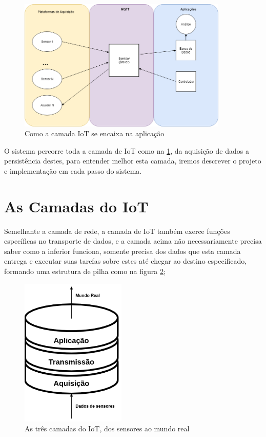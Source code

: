 \begin{figure}[h!]
\centering
\includegraphics[width=10cm]{./02_Capitulos/02_Cap1/figures/iot_app-layers}
\caption{Como a camada IoT se encaixa na aplicação}
\label{fig:1.1.0/iot_app-layers}
\end{figure}


O sistema percorre toda a camada de IoT como na \ref{fig:1.1.0/iot_app-layers}, da aquisição de dados a persistência destes, para entender melhor esta camada, iremos descrever o projeto e implementação em cada passo do sistema.

\section{As Camadas do IoT}
\label{section:camadas_iot}

Semelhante a camada de rede, a camada de IoT também exerce funções específicas no transporte de dados, e a camada acima não necessariamente precisa saber como a inferior funciona, somente precisa dos dados que esta camada entrega e executar suas tarefas sobre estes até chegar ao destino especificado, formando uma estrutura de pilha como na figura \ref{fig:1.2.0/camadas_iot};

\begin{figure}[h!]
\centering
\includegraphics[width=5cm]{./02_Capitulos/02_Cap1/figures/iot_stack}
\caption{As três camadas do IoT, dos sensores ao mundo real}
\label{fig:1.2.0/camadas_iot}
\end{figure}

